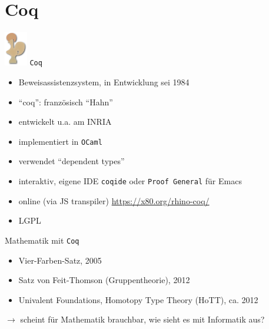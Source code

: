 \documentclass[aspectratio=169]{beamer}
\begin{document}
\section{Coq}
\begin{frame}
  \begin{center}
    \includegraphics[width=1.0cm]{coq_logo.png}
    \Large{\texttt{Coq}}
  \end{center}
  \begin{itemize}
  \item Beweisassistenzsystem, in Entwicklung sei 1984
  \item ``coq'': französisch ``Hahn''
  \item entwickelt u.a. am INRIA
  \item implementiert in \texttt{OCaml}
  \item verwendet ``dependent types''
  \item interaktiv, eigene IDE \texttt{coqide} oder \texttt{Proof General} für Emacs
  \item online (via JS transpiler) \url{https://x80.org/rhino-coq/}
  \item LGPL
  \end{itemize}
\end{frame}
\begin{frame}
  \begin{center}
    \Large{Mathematik mit \texttt{Coq}}
  \end{center}
  \begin{itemize}
  \item Vier-Farben-Satz, 2005
  \item Satz von Feit-Thomson (Gruppentheorie), 2012
  \item Univalent Foundations, Homotopy Type Theory (HoTT), ca. 2012
  \end{itemize}
  \pause
  \vfill
  \begin{center}  
    $\rightarrow$ scheint für Mathematik brauchbar, wie sieht es mit Informatik aus?
  \end{center}
\end{frame}
\end{document}
